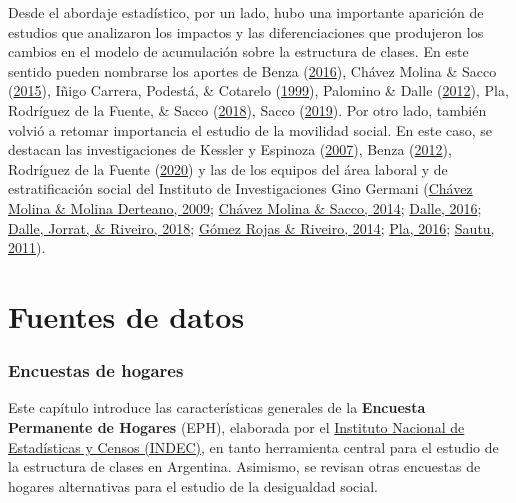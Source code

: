 \documentclass[
]{article}
\begin{document}
Desde el abordaje estadístico, por un lado, hubo una importante aparición de estudios que analizaron los impactos y las diferenciaciones que produjeron los cambios en el modelo de acumulación sobre la estructura de clases. En este sentido pueden nombrarse los aportes de Benza (\protect\hyperlink{ref-Benza2016}{2016}), Chávez Molina \& Sacco (\protect\hyperlink{ref-ChavezMolina2015}{2015}), Iñigo Carrera, Podestá, \& Cotarelo (\protect\hyperlink{ref-InigoCarrera1999}{1999}), Palomino \& Dalle (\protect\hyperlink{ref-Palomino.Dalle2012}{2012}), Pla, Rodríguez de la Fuente, \& Sacco (\protect\hyperlink{ref-Pla.etal2018}{2018}), Sacco (\protect\hyperlink{ref-Sacco2019}{2019}). Por otro lado, también volvió a retomar importancia el estudio de la movilidad social. En este caso, se destacan las investigaciones de Kessler y Espinoza (\protect\hyperlink{ref-Kessler2007}{2007}), Benza (\protect\hyperlink{ref-Benza2012}{2012}), Rodríguez de la Fuente (\protect\hyperlink{ref-RodriguezdelaFuente2020}{2020}) y las de los equipos del área laboral y de estratificación social del Instituto de Investigaciones Gino Germani (\protect\hyperlink{ref-ChavezMolina2009}{Chávez Molina \& Molina Derteano, 2009}; \protect\hyperlink{ref-ChavezMolina2014}{Chávez Molina \& Sacco, 2014}; \protect\hyperlink{ref-Dalle2016}{Dalle, 2016}; \protect\hyperlink{ref-Dalle.etal2018}{Dalle, Jorrat, \& Riveiro, 2018}; \protect\hyperlink{ref-GomezRojas.Riveiro2014}{Gómez Rojas \& Riveiro, 2014}; \protect\hyperlink{ref-Pla2016}{Pla, 2016}; \protect\hyperlink{ref-Sautu2011}{Sautu, 2011}).

\hypertarget{part-fuentes-de-datos}{%
\part{Fuentes de datos}\label{part-fuentes-de-datos}}

\hypertarget{fuentes}{%
\section{Encuestas de hogares}\label{fuentes}}

Este capítulo introduce las características generales de la \textbf{Encuesta Permanente de Hogares} (EPH), elaborada por el \href{https://www.indec.gob.ar}{Instituto Nacional de Estadísticas y Censos (INDEC)}, en tanto herramienta central para el estudio de la estructura de clases en Argentina. Asimismo, se revisan otras encuestas de hogares alternativas para el estudio de la desigualdad social.
\end{document}
